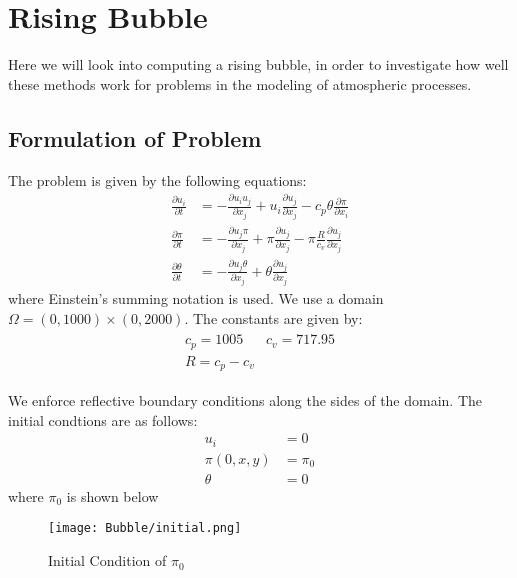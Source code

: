 \section{Rising Bubble}

Here we will look into computing a rising bubble, in order to investigate how well these methods work for problems in the modeling of atmospheric processes.
\subsection{Formulation of Problem}
The problem is given by the following equations\cite{Bryan2002}:
\begin{align*}
    \frac{\partial u_i}{\partial t} &= -\frac{\partial u_i u_j}{\partial x_j} + u_i\frac{\partial u_j}{\partial x_j} - c_p \theta \frac{\partial \pi}{\partial x_i} \\
    \frac{\partial \pi}{\partial t} &= -\frac{\partial u_j \pi}{\partial x_j} + \pi\frac{\partial u_j}{\partial x_j} - \pi \frac{R}{c_v}\frac{\partial u_j}{\partial x_j} \\
    \frac{\partial \theta}{\partial t} &= -\frac{\partial u_j \theta}{\partial x_j} + \theta\frac{\partial u_j}{\partial x_j}
\end{align*}
where Einstein's summing notation is used.
We use a domain $\Omega = (0,1000) \times (0,2000)$.
The constants are given by:
\begin{align*}
    \begin{matrix}
    c_p = 1005 & c_v = 717.95 \\
    R = c_p - c_v 
    \end{matrix}
\end{align*}

We enforce reflective boundary conditions along the sides of the domain.
The initial condtions are as follows:
\begin{align*}
    u_i &= 0\\
    \pi(0,x,y) &= \pi_0\\
    \theta &= 0
\end{align*}
where $\pi_0$ is shown below
\begin{figure}[H]
    \centering
    \begin{minipage}{1\textwidth}
        \texttt{[image: Bubble/initial.png]} %
        \caption{Initial Condition of $\pi_0$}
        \label{fig:first order 8 0.5}
    \end{minipage}
\end{figure}
